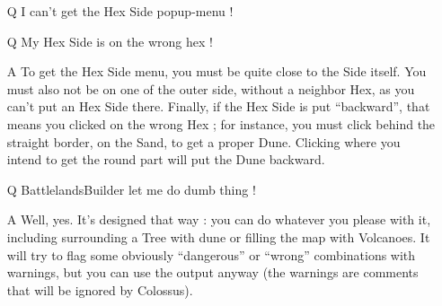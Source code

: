 \documentclass{article}
\begin{document}
\begin{enumerate}

\item[Q] I can't get the Hex Side popup-menu !
\item[Q] My Hex Side is on the wrong hex !

\item[A] To get the Hex Side menu, you must be quite close
to the Side itself. You must also not be on one
of the outer side, without a neighbor Hex, as you
can't put an Hex Side there. Finally, if the Hex
Side is put ``backward'', that means you clicked on
the wrong Hex ; for instance, you must click behind
the straight border, on the Sand, to get a proper
Dune. Clicking where you intend to get the round
part will put the Dune backward.

\item[Q] BattlelandsBuilder let me do dumb thing !

\item[A] Well, yes. It's designed that way : you can do
whatever you please with it, including surrounding
a Tree with dune or filling the map with Volcanoes.
It will try to flag some obviously ``dangerous''
or ``wrong'' combinations with warnings, but you
can use the output anyway (the warnings are
comments that will be ignored by Colossus).

\end{enumerate}
\end{document}

